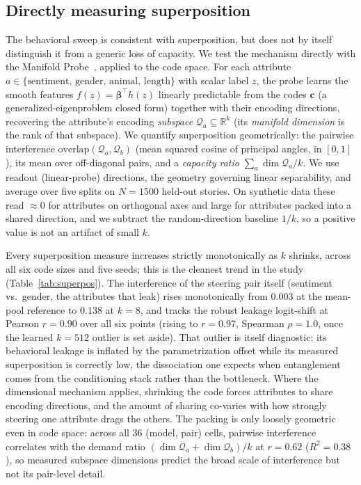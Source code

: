 \documentclass[11pt]{article}
\newcommand{\R}{\mathbb{R}}
\newcommand{\cb}{\bm{c}}
\begin{document}
\subsection{Directly measuring superposition}
\label{sec:superpos}
The behavioral sweep is consistent with superposition, but does not by itself
distinguish it from a generic loss of capacity. We test the mechanism directly with
the Manifold Probe~\cite{manifold2026}, applied to the code space. For each attribute
$a\in\{\text{sentiment, gender, animal, length}\}$ with scalar label $z$, the probe
learns the smooth features $f(z)=\bm\beta^\top h(z)$ linearly predictable from the
codes $\cb$ (a generalized-eigenproblem closed form) together with their encoding
directions, recovering the attribute's encoding \emph{subspace}
$\mathcal Q_a\subseteq\R^{k}$ (its \emph{manifold dimension} is the rank of that
subspace). We quantify superposition geometrically: the pairwise interference
$\mathrm{overlap}(\mathcal Q_a,\mathcal Q_b)$ (mean squared cosine of principal
angles, in $[0,1]$), its mean over off-diagonal pairs, and a \emph{capacity ratio}
$\sum_a\dim\mathcal Q_a/k$. We use readout (linear-probe) directions, the geometry
governing linear separability, and average over five splits on $N{=}1500$ held-out
stories. On synthetic data these read $\approx 0$ for attributes on orthogonal axes
and large for attributes packed into a shared direction, and we subtract the
random-direction baseline $1/k$, so a positive value is not an artifact of small $k$.

Every superposition measure increases strictly monotonically as $k$ shrinks, across
all six code sizes and five seeds; this is the cleanest trend in the study
(Table~\ref{tab:superpos}). The interference of the steering pair itself
(sentiment vs.\ gender, the attributes that leak) rises monotonically from $0.003$ at
the mean-pool reference to $0.138$ at $k{=}8$, and tracks the robust leakage
logit-shift at Pearson $r{=}0.90$ over all six points (rising to $r{=}0.97$, Spearman
$\rho{=}1.0$, once the learned $k{=}512$ outlier is set aside). That outlier is itself
diagnostic: its behavioral leakage is inflated by the parametrization offset while its
measured superposition is correctly low, the dissociation one expects when
entanglement comes from the conditioning stack rather than the bottleneck. Where the
dimensional mechanism applies, shrinking the code forces attributes to share encoding
directions, and the amount of sharing co-varies with how strongly steering one
attribute drags the others. The packing is only loosely geometric even in code space:
across all 36 (model, pair) cells, pairwise interference correlates with the demand
ratio $(\dim\mathcal Q_a+\dim\mathcal Q_b)/k$ at $r{=}0.62$ ($R^2{=}0.38$), so
measured subspace dimensions predict the broad scale of interference but not its
pair-level detail.
\end{document}
